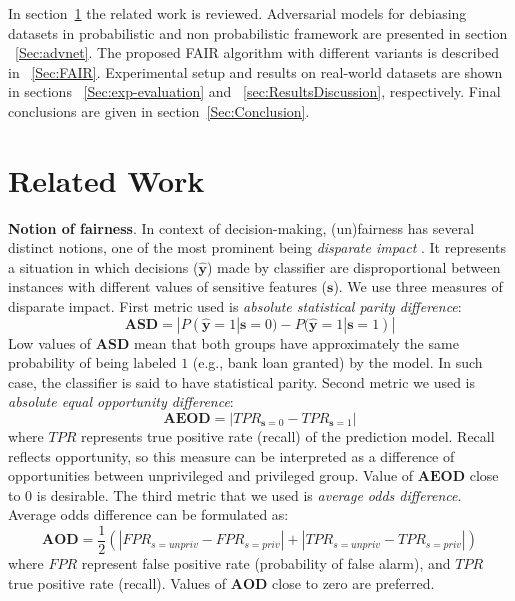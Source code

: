 \documentclass[preprint,12pt]{elsarticle}
\begin{document}
In section~\ref{Sec:Related Work} the related work is reviewed. Adversarial models for debiasing datasets in probabilistic and non probabilistic framework are presented in section ~\ref{Sec:advnet}. The proposed FAIR algorithm with different variants is described in ~\ref{Sec:FAIR}.
Experimental setup and results on real-world datasets are shown in sections ~\ref{Sec:exp-evaluation} and ~\ref{sec:ResultsDiscussion}, respectively. Final conclusions are given in section~\ref{Sec:Conclusion}.


\section{Related Work}
\label{Sec:Related Work}

\textbf{Notion of fairness}. In context of decision-making, (un)fairness has several distinct notions, one of the most prominent being {\em disparate impact} \cite{barocas2016big}. It represents a situation in which decisions ($\hat{\mathbf{y}}$) made by classifier are disproportional between instances with different values of sensitive features ($\mathbf{s}$). We use three measures of disparate impact. First metric used is \textit{absolute statistical parity difference}:
\begin{equation}
\mathbf{ASD} = |P(\hat{\mathbf{y}}=1|\mathbf{s}=0) - P(\hat{\mathbf{y}}=1|\mathbf{s}=1)|
\label{metric:asd}
\end{equation}
Low values of $\mathbf{ASD}$ mean that both groups have approximately the same probability of being labeled $1$ (e.g., bank loan granted) by the model. In such case, the classifier is said to have statistical parity.
Second metric we used is \textit{absolute equal opportunity difference}:
\begin{equation}
\mathbf{AEOD} = |TPR_{\mathbf{s}=0} - TPR_{\mathbf{s}=1}|
\label{metric:aeod}
\end{equation}
where $TPR$ represents true positive rate (recall) of the prediction model. Recall reflects opportunity, so this measure can be interpreted as a difference of opportunities between unprivileged and privileged group. Value of $\mathbf{AEOD}$ close to 0 is desirable. The third metric that we used is \textit{average odds difference}. Average odds difference can be formulated as:
\begin{equation}
\mathbf{AOD} = \frac{1}{2}(|FPR_{s=unpriv} - FPR_{s=priv}| + |TPR_{s=unpriv} - TPR_{s=priv}|)
\label{metric:aod}
\end{equation}
where $FPR$ represent false positive rate (probability of false alarm), and $TPR$ true positive rate (recall). Values of $\mathbf{AOD}$ close to zero are preferred.
\end{document}
